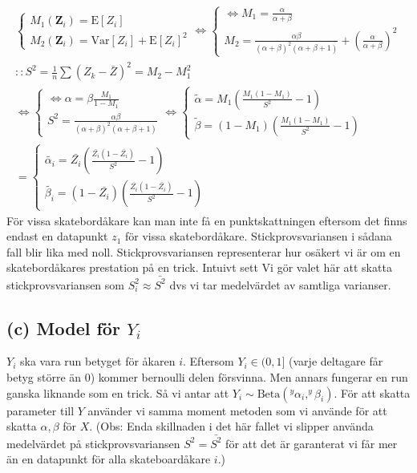 \documentclass{assignment}
\begin{document}
\begin{align*}
    \left\{\begin{matrix}
        M_1(\mathbf{Z}_i)  = \text{E}[Z_i]
        \\ M_2(\mathbf{Z}_i) = \text{Var}[Z_i]+\text{E}[Z_i]^2
    \end{matrix}\right.
    \Longleftrightarrow \left\{\begin{matrix}
        \Leftrightarrow M_1 = \frac{\alpha}{\alpha+\beta}
        \\ M_2 = \frac{\alpha\beta}{(\alpha+\beta)^2(\alpha+\beta+1)}+(\frac{\alpha}{\alpha+\beta})^2
    \end{matrix}\right.
    \\ :: S^2=\frac{1}{n}\sum (Z_{k}-\bar{Z})^2 = M_2-M_1^2
    \\ \Longleftrightarrow \left\{\begin{matrix}
        \Leftrightarrow \alpha = \beta\frac{M_1}{1-M_1}
        \\ S^2 = \frac{\alpha\beta}{(\alpha+\beta)^2(\alpha+\beta+1)}
    \end{matrix}\right.
    \Longleftrightarrow \left\{\begin{matrix}
        \widetilde{\alpha} = M_1\left(\frac{M_1(1-M_1)}{S^2}-1\right)
        \\ \widetilde{\beta} = (1-M_1)\left(\frac{M_1(1-M_1)}{S^2}-1\right)
    \end{matrix}\right.
    \\ = \left\{\begin{matrix}
        \widetilde{\alpha_i} = \bar{Z_i}\left(\frac{\bar{Z_i}(1-\bar{Z_i})}{S^2}-1\right)
        \\ \widetilde{\beta_i} = (1-\bar{Z_i})\left(\frac{\bar{Z_i}(1-\bar{Z_i})}{S^2}-1\right)
    \end{matrix}\right.
\end{align*}
För vissa skatebordåkare kan man inte få en punktskattningen eftersom det finns endast en
datapunkt $z_1$ för vissa skatebordåkare. Stickprovsvariansen i sådana fall blir lika med noll. Stickprovsvariansen
representerar hur osäkert vi är om en skatebordåkares prestation på en trick. Intuivt sett Vi gör valet
här att skatta stickprovsvariansen som $S_i^2\approx \bar{S^2}$ dvs vi tar medelvärdet av samtliga varianser. 
\subsection*{(c) Model för $Y_i$}
$Y_i$ ska vara run betyget för åkaren $i$. Eftersom $Y_i\in(0,1]$ (varje deltagare får betyg större än 0) 
kommer bernoulli delen försvinna. Men annars fungerar en run ganska liknande som en trick. 
Så vi antar att $Y_i\sim \text{Beta}(^y\alpha_i,^y\beta_i)$. 
För att skatta parameter till $Y$ använder vi samma moment metoden som vi använde för att skatta $\alpha,\beta$ för $X$.
(Obs: Enda skillnaden i det här fallet vi slipper använda medelvärdet på stickprovsvariansen $S^2=\bar{S^2}$
för att det är garanterat vi får mer än en datapunkt för alla skateboardåkare $i$.)
\end{document}
